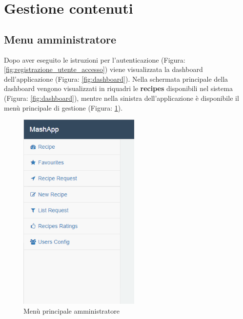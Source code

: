 %


\section{Gestione contenuti} %
\label{sec:gestione_contenuti}


	\subsection{Menu amministratore}
	\label{sec:menu_amministrazione}
		Dopo aver eseguito le istruzioni per l'autenticazione\gloss{} (Figura: \ref{fig:registrazione_utente_accesso}) viene visualizzata la dashboard\gloss{} dell’applicazione (Figura: \ref{fig:dashboard}).\newline
		Nella schermata principale della dashboard\gloss{} vengono visualizzati in riquadri le \textbf{recipes}\gloss{} disponibili nel sistema (Figura: \ref{fig:dashboard}), mentre nella sinistra dell'applicazione è disponibile il menù principale di gestione (Figura: \ref{fig:menu_principale_utente}).
		\begin{figure}[H]
			\centering
			\centerline{\includegraphics[width=6cm]{images/menu_principale_amministratore.png}}
			\caption{Menù principale amministratore}
			\label{fig:menu_principale_utente}
		\end{figure}


